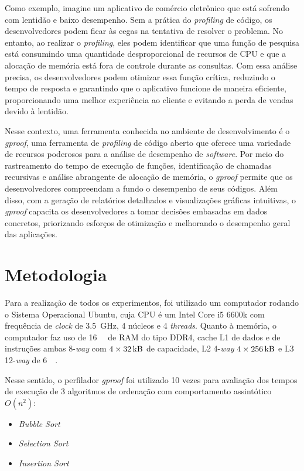 \documentclass[12pt,a4paper]{article}
\begin{document}
Como exemplo, imagine um aplicativo de comércio eletrônico que está sofrendo com lentidão e baixo desempenho. Sem a prática do \textit{profiling} de código, os desenvolvedores podem ficar às cegas na tentativa de resolver o problema. No entanto, ao realizar o \textit{profiling}, eles podem identificar que uma função de pesquisa está consumindo uma quantidade desproporcional de recursos de CPU e que a alocação de memória está fora de controle durante as consultas. Com essa análise precisa, os desenvolvedores podem otimizar essa função crítica, reduzindo o tempo de resposta e garantindo que o aplicativo funcione de maneira eficiente, proporcionando uma melhor experiência ao cliente e evitando a perda de vendas devido à lentidão. 

Nesse contexto, uma ferramenta conhecida no ambiente de desenvolvimento é o \textit{gproof}, uma ferramenta de \textit{profiling} de código aberto que oferece uma variedade de recursos poderosos para a análise de desempenho de \textit{software}. Por meio do rastreamento do tempo de execução de funções, identificação de chamadas recursivas e análise abrangente de alocação de memória, o \textit{gproof} permite que os desenvolvedores compreendam a fundo o desempenho de seus códigos. Além disso, com a geração de relatórios detalhados e visualizações gráficas intuitivas, o \textit{gproof} capacita os desenvolvedores a tomar decisões embasadas em dados concretos, priorizando esforços de otimização e melhorando o desempenho geral das aplicações.

\section{Metodologia} \label{sec:metodologia}

Para a realização de todos os experimentos, foi utilizado um computador rodando o Sistema Operacional Ubuntu, cuja CPU é um Intel Core i5 6600k com frequência de \textit{clock} de \SI{3,5}{\giga\hertz}, 4 núcleos e 4 \textit{threads}. Quanto à memória, o computador faz uso de \SI{16}{\giga\byte} de RAM do tipo DDR4, cache L1 de dados e de instruções ambas 8-\textit{way} com $4 \times \SI{32}{\kilo\byte}$ de capacidade, L2 4-\textit{way} $4 \times \SI{256}{\kilo\byte}$ e L3 12-\textit{way} de \SI{6}{\mega\byte}.

Nesse sentido, o perfilador \textit{gproof} foi utilizado 10 vezes para avaliação dos tempos de execução de 3 algoritmos de ordenação com comportamento assintótico $O(n^2)$:
\begin{itemize}
    \item \textit{Bubble Sort}
    \item \textit{Selection Sort}
    \item \textit{Insertion Sort}
\end{itemize}
\end{document}

